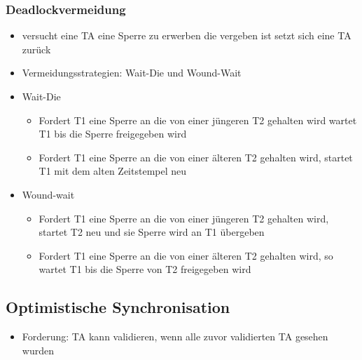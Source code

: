 \documentclass[a4paper]{article}
\begin{document}
    \subsubsection{Deadlockvermeidung}
    \begin{itemize}
        \item versucht eine TA eine Sperre zu erwerben die vergeben ist setzt sich eine TA zurück
        \item Vermeidungsstrategien: Wait-Die und Wound-Wait
        \item Wait-Die
        
        \begin{itemize}
            \item Fordert T1 eine Sperre an die von einer jüngeren T2 gehalten wird wartet T1 bis die Sperre freigegeben wird
            \item Fordert T1 eine Sperre an die von einer älteren T2 gehalten wird, startet T1 mit dem alten Zeitstempel neu
        \end{itemize}
        
        \item Wound-wait
        \begin{itemize}
            \item Fordert T1 eine Sperre an die von einer jüngeren T2 gehalten wird, startet T2 neu und sie Sperre wird an T1 übergeben
            \item Fordert T1 eine Sperre an die von einer älteren T2 gehalten wird, so wartet T1 bis die Sperre von T2 freigegeben wird
        \end{itemize}
    \end{itemize}

\subsection{Optimistische Synchronisation}
\begin{itemize}
    \item Forderung: TA kann validieren, wenn alle zuvor validierten TA gesehen wurden
\end{itemize}
\end{document}
